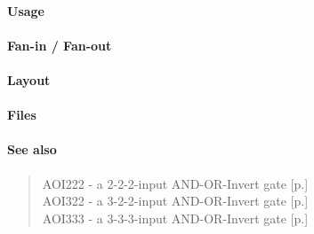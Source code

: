 \paragraph{Usage}

\paragraph{Fan-in / Fan-out}

\paragraph{Layout}

\paragraph{Files}

\paragraph{See also}
\begin{quote}
    AOI222 - a 2-2-2-input AND-OR-Invert gate [p.\pageref{AOI222}] \\
    AOI322 - a 3-2-2-input AND-OR-Invert gate [p.\pageref{AOI322}] \\
    AOI333 - a 3-3-3-input AND-OR-Invert gate [p.\pageref{AOI333}]
\end{quote}
